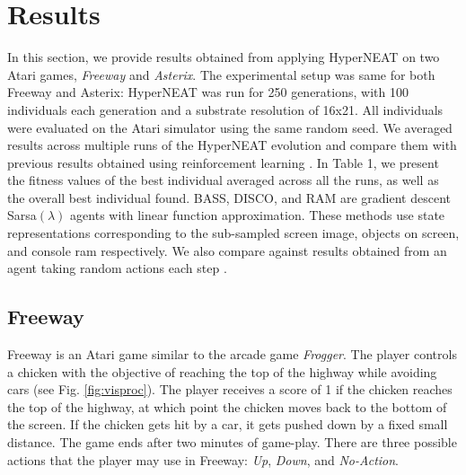\documentclass{acm_proc_article-sp}
\begin{document}
\section{Results}
\label{sec:results}
In this section, we provide results obtained from applying HyperNEAT on two Atari games, \textit{Freeway} and \textit{Asterix}. The experimental setup was same for both Freeway and Asterix: HyperNEAT was run for 250 generations, with 100 individuals each generation and a substrate resolution of 16x21. All individuals were evaluated on the Atari simulator using the same random seed. We averaged results across multiple runs of the HyperNEAT evolution and compare them with previous results obtained using reinforcement learning \cite{naddaf10}. In Table 1, we present the fitness values of the best individual averaged across all the runs, as well as the overall best individual found. BASS, DISCO, and RAM are gradient descent Sarsa$(\lambda)$ agents with linear function approximation. These methods use state representations corresponding to the sub-sampled screen image, objects on screen, and console ram respectively. We also compare against results obtained from an agent taking random actions each step \cite{naddaf10}. 

\subsection {Freeway}

Freeway is an Atari game similar to the arcade game \textit{Frogger}. The player controls a chicken with the objective of reaching the top of the highway while avoiding cars (see Fig. \ref{fig:visproc}). The player receives a score of 1 if the chicken reaches the top of the highway, at which point the chicken moves back to the bottom of the screen. If the chicken gets hit by a car, it gets pushed down by a fixed small distance. The game ends after two minutes of game-play. There are three possible actions that the player may use in Freeway: \textit{Up}, \textit{Down}, and \textit{No-Action}.
\end{document}
